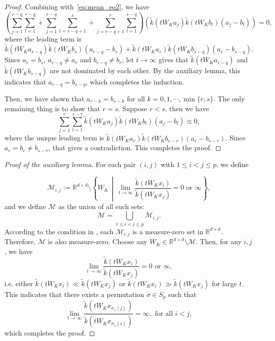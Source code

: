 \documentclass{article}
\begin{document}
\begin{proof}
Combining with~\eqref{eq:mean_eq2}, we have
\begin{equation}
    (\sum_{j=1}^{r-q}\sum_{l=1}^{r-q}+\sum_{j=1}^{r-q}\sum_{l=s-q+1}^s+\sum_{j=r-q+1}^{r}\sum_{l=1}^{s-q}) \left(\tilde k(tW_Ka_j)\tilde k(tW_Kb_l)(a_j-b_l)\right)=0,
\end{equation}
where the leading term is
\begin{equation}
    \tilde k(tW_Ka_{r-q})\tilde k(tW_Kb_{s})(a_{r-q}-b_{s})+\tilde k(tW_Ka_{r})\tilde k(tW_Kb_{s-q})(a_{r}-b_{s-q}).
\end{equation}
Since $a_r=b_s$, $a_{r-q}\neq a_r$ and $b_{r-q}\neq b_r$, let $t\to\infty$ gives that
$\tilde k(tW_Ka_{r-q})$ and $\tilde k(tW_Kb_{s-q})$ are not dominated by each other. By the auxiliary lemma, this indicates that $a_{r-q}=b_{s-q}$, which completes the induction.

Then, we have shown that $a_{r-k}=b_{s-k}$ for all $k=0, 1,\cdots, \min\{r,s\}$. The only remaining thing is to show that $r=s$. Suppose $r<s$, then we have
\begin{equation}
    \sum_{j=1}^r\sum_{l=1}^{s-r} \tilde k(tW_Ka_j)\tilde k(tW_Kb_l)(a_j-b_l)\equiv 0,
\end{equation}
where the unique leading term is $\tilde k(tW_Ka_r)\tilde k(tW_Kb_{s-r})(a_r-b_{s-r})$. Since $a_r=b_r\neq b_{s-r}$, that gives a contradiction.
This completes the proof.
\end{proof}

\begin{proof}[Proof of the auxiliary lemma]
    For each pair $(i,j)$ with \(1 \le i < j \le p\), we define

    \begin{equation}
        \mathcal{M}_{i,j} := \mathbb R^{d\times d}\setminus \left\{ W_K \,\middle|\, \lim_{t \to \infty}\frac{\tilde{k}(tW_Kx_i)}{\tilde{k}(tW_Kx_j)} = 0 \text{ or } \infty\right\},
    \end{equation}
    and we define $\mathcal M$ as the union of all such sets:
    \begin{equation}
        \mathcal{M} = \bigcup_{1 \le i < j \le p} \mathcal{M}_{i,j}.
    \end{equation}
According to the condition in , each $\mathcal M_{i,j}$ is a measure-zero set in $\mathbb R^{d\times d}$. Therefore, $\mathcal M$ is also measure-zero.
Choose any $W_K \in \mathbb R^{d\times d}\setminus \mathcal M$. Then, for any $i,j$, we have
\begin{equation}
    \lim_{t\to\infty} \frac{\tilde k(tW_K x_i)}{\tilde k(tW_K x_j)} = 0 \text{ or } \infty,
\end{equation}
i.e. either $\tilde k(tW_Kx_i)\ll \tilde k(tW_Kx_j)$ or $\tilde k(tW_Kx_i)\gg \tilde k(tW_Kx_j)$ for large $t$. This indicates that there exists a permutation $\sigma\in S_p$ such that
\begin{equation}
    \lim_{t\to\infty} \frac{\tilde k(tW_K x_{\sigma_1(j)})}{\tilde k(tW_K x_{\sigma_1(i)})}=\infty, \text{ for all } i<j,
\end{equation}
which completes the proof.
\end{proof}
\end{document}
